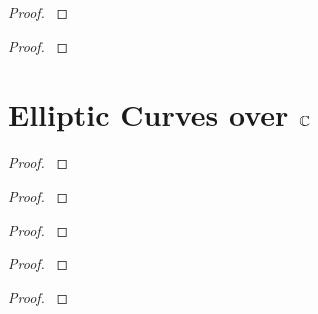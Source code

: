 \documentclass[12pt,reqno]{amsart}
\begin{document}
\begin{exe}\label{5.17}

\begin{proof}\label{s5.17}

\end{proof} 
\end{exe} 

\begin{exe}\label{5.18}

\begin{proof}\label{s5.18}

\end{proof} 
\end{exe} 


\newpage
\section{Elliptic Curves over ${\mathbb C}$}\label{6}

\begin{exe}\label{6.1}

\begin{proof}\label{s6.1}

\end{proof} 
\end{exe} 

\begin{exe}\label{6.2}

\begin{proof}\label{s6.2}

\end{proof} 
\end{exe} 

\begin{exe}\label{6.3}

\begin{proof}\label{s6.3}

\end{proof} 
\end{exe} 

\begin{exe}\label{6.4}	

\begin{proof}\label{s6.4}

\end{proof} 
\end{exe} 

\begin{exe}\label{6.5}

\begin{proof}\label{s6.5}

\end{proof} 
\end{exe} 
\end{document}
